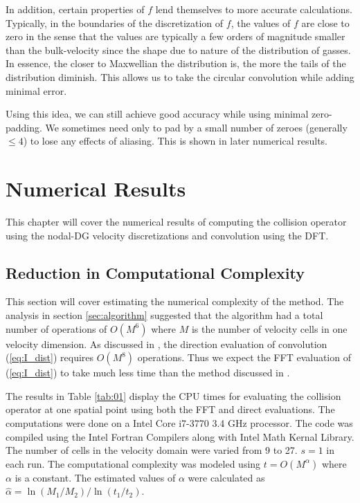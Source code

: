 \documentclass[12pt]{CSUNthesis}
\begin{document}
In addition, certain properties of $f$ lend themselves to more accurate calculations. 
Typically, in the boundaries of the discretization of $f$, the values of $f$ are close to zero in the sense that the values are typically a few orders of magnitude smaller than the bulk-velocity since the shape due to nature of the distribution of gasses. In essence, the closer to Maxwellian the distribution is, the more the tails of the distribution diminish. This allows us to take the circular convolution while adding minimal error.

Using this idea, we can still achieve good accuracy while using minimal zero-padding. We sometimes need only to pad by a small number of zeroes (generally $\leq 4$) to lose any effects of aliasing. This is shown in later numerical results.



\chapter{Numerical Results}

This chapter will cover the numerical results of computing the collision operator using the nodal-DG velocity discretizations and convolution using the DFT. 

\section{Reduction in Computational Complexity}

This section will cover estimating the numerical complexity of the method. 
The analysis in section \ref{sec:algorithm} suggested that the algorithm had a total number of operations of $O(M^6)$ where $M$ is the number of velocity cells in one velocity dimension. 
As discussed in \cite{AlekseenkoJosyula2012a}, the direction evaluation of convolution (\ref{eq:I_dist}) requires $O(M^8)$ operations. Thus we expect the FFT evaluation of (\ref{eq:I_dist}) to take much less time than the method discussed in \cite{AlekseenkoJosyula2012a}.

The results in Table \ref{tab:01} display the CPU times for evaluating the collision operator at one spatial point using both the FFT and direct evaluations. 
The computations were done on a Intel Core i7-3770 3.4 GHz processor. 
The code was compiled using the Intel Fortran Compilers along with Intel Math Kernal Library.
The number of cells in the velocity domain were varied from 9 to 27. $s=1$ in each run. 
The computational complexity was modeled using $t=O(M^\alpha)$ where $\alpha$ is a constant. 
The estimated values of $\alpha$ were calculated as $\hat{\alpha}=\ln(M_{1}/M_{2})/\ln(t_{1}/t_{2})$. 
\end{document}

